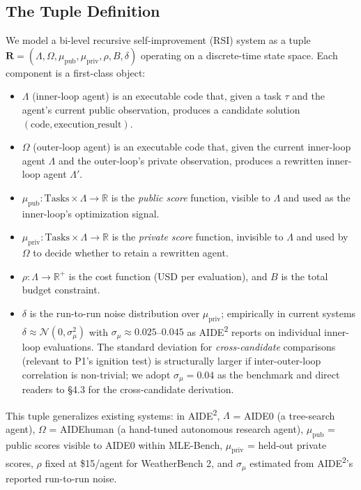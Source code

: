 
\subsection{The Tuple Definition}

We model a bi-level recursive self-improvement (RSI) system as a tuple $\mathbf{R} = (\Lambda, \Omega, \mu_{\text{pub}}, \mu_{\text{priv}}, \rho, B, \delta)$ operating on a discrete-time state space. Each component is a first-class object:

\begin{itemize}
    \item $\Lambda$ (inner-loop agent) is an executable code that, given a task $\tau$ and the agent's current public observation, produces a candidate solution $(\text{code}, \text{execution\_result})$.
    \item $\Omega$ (outer-loop agent) is an executable code that, given the current inner-loop agent $\Lambda$ and the outer-loop's private observation, produces a rewritten inner-loop agent $\Lambda'$.
    \item $\mu_{\text{pub}} : \text{Tasks} \times \Lambda \to \mathbb{R}$ is the \textit{public score} function, visible to $\Lambda$ and used as the inner-loop's optimization signal.
    \item $\mu_{\text{priv}} : \text{Tasks} \times \Lambda \to \mathbb{R}$ is the \textit{private score} function, invisible to $\Lambda$ and used by $\Omega$ to decide whether to retain a rewritten agent.
    \item $\rho : \Lambda \to \mathbb{R}^+$ is the cost function (USD per evaluation), and $B$ is the total budget constraint.
    \item $\delta$ is the run-to-run noise distribution over $\mu_{\text{priv}}$; empirically in current systems $\delta \approx \mathcal{N}(0, \sigma^2_\mu)$ with $\sigma_\mu \approx 0.025$--$0.045$ as AIDE\textsuperscript{2} reports on individual inner-loop evaluations. The standard deviation for \textit{cross-candidate} comparisons (relevant to P1's ignition test) is structurally larger if inter-outer-loop correlation is non-trivial; we adopt $\sigma_\mu = 0.04$ as the benchmark and direct readers to \S4.3 for the cross-candidate derivation.
\end{itemize}

This tuple generalizes existing systems: in AIDE\textsuperscript{2}, $\Lambda$ = AIDE0 (a tree-search agent), $\Omega$ = AIDEhuman (a hand-tuned autonomous research agent), $\mu_{\text{pub}}$ = public scores visible to AIDE0 within MLE-Bench, $\mu_{\text{priv}}$ = held-out private scores, $\rho$ fixed at \$15/agent for WeatherBench 2, and $\sigma_\mu$ estimated from AIDE\textsuperscript{2}'s reported run-to-run noise.

